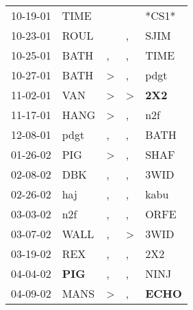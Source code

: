\begin{supertabular}{p{0.07\textwidth}p{0.06\textwidth}p{0.02\textwidth}p{0.02\textwidth}p{0.06\textwidth}}
 10-19-01\textsuperscript{} &          TIME\textsuperscript{} &               &               &                            *CS1* \\
 10-23-01\textsuperscript{} &          ROUL\textsuperscript{} &               &             , &           SJIM\textsuperscript{} \\
 10-25-01\textsuperscript{} &          BATH\textsuperscript{} &             , &             , &           TIME\textsuperscript{} \\
 10-27-01\textsuperscript{} &          BATH\textsuperscript{} &  \textgreater &             , &           pdgt\textsuperscript{} \\
 11-02-01\textsuperscript{} &           VAN\textsuperscript{} &  \textgreater &  \textgreater &   \textbf{2X2\textsuperscript{}} \\
 11-17-01\textsuperscript{} &          HANG\textsuperscript{} &  \textgreater &             , &            n2f\textsuperscript{} \\
 12-08-01\textsuperscript{} &          pdgt\textsuperscript{} &             , &             , &           BATH\textsuperscript{} \\
 01-26-02\textsuperscript{} &           PIG\textsuperscript{} &  \textgreater &             , &           SHAF\textsuperscript{} \\
 02-08-02\textsuperscript{} &           DBK\textsuperscript{} &             , &             , &           3WID\textsuperscript{} \\
 02-26-02\textsuperscript{} &           haj\textsuperscript{} &             , &             , &           kabu\textsuperscript{} \\
 03-03-02\textsuperscript{} &           n2f\textsuperscript{} &             , &             , &           ORFE\textsuperscript{} \\
 03-07-02\textsuperscript{} &          WALL\textsuperscript{} &             , &  \textgreater &           3WID\textsuperscript{} \\
 03-19-02\textsuperscript{} &           REX\textsuperscript{} &             , &             , &            2X2\textsuperscript{} \\
 04-04-02\textsuperscript{} &  \textbf{PIG\textsuperscript{}} &             , &             , &           NINJ\textsuperscript{} \\
 04-09-02\textsuperscript{} &          MANS\textsuperscript{} &  \textgreater &             , &  \textbf{ECHO\textsuperscript{}} \\

\end{supertabular}
